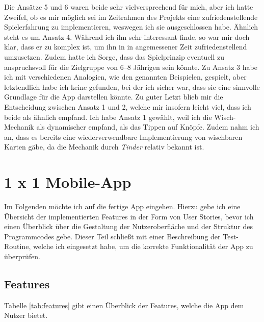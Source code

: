 Die Ansätze 5 und 6 waren beide sehr vielversprechend für mich, aber ich hatte Zweifel, ob es mir möglich sei im Zeitrahmen des Projekts eine zufriedenstellende Spielerfahrung zu implementieren, weswegen ich sie ausgeschlossen habe.
Ähnlich steht es um Ansatz 4. Während ich ihn sehr interessant finde, so war mir doch klar, dass er zu komplex ist, um ihn in in angemessener Zeit zufriedenstellend umzusetzen.
Zudem hatte ich Sorge, dass das Spielprinzip eventuell zu anspruchsvoll für die Zielgruppe von 6--8 Jährigen sein könnte.
Zu Ansatz 3 habe ich mit verschiedenen Analogien, wie den genannten Beispielen, gespielt, aber letztendlich habe ich keine gefunden, bei der ich sicher war, dass sie eine sinnvolle Grundlage für die App darstellen könnte.
Zu guter Letzt blieb mir die Entscheidung zwischen Ansatz 1 und 2, welche mir insofern leicht viel, dass ich beide als ähnlich empfand.
Ich habe Ansatz 1 gewählt, weil ich die Wisch-Mechanik als dynamischer empfand, als das Tippen auf Knöpfe. 
Zudem nahm ich an, dass es bereits eine wiederverwendbare Implementierung von wischbaren Karten gäbe, da die Mechanik durch \emph{Tinder} relativ bekannt ist. 

\section{1 x 1 Mobile-App}

Im Folgenden möchte ich auf die fertige App eingehen. Hierzu gebe ich eine Übersicht der implementierten Features in der Form von User Stories, bevor ich einen Überblick über die Gestaltung der Nutzeroberfläche und der Struktur des Programmcodes gebe.
Dieser Teil schließt mit einer Beschreibung der Test-Routine, welche ich eingesetzt habe, um die korrekte Funktionalität der App zu überprüfen.

\subsection{Features}

Tabelle \ref{tab:features} gibt einen Überblick der Features, welche die App dem Nutzer bietet.

